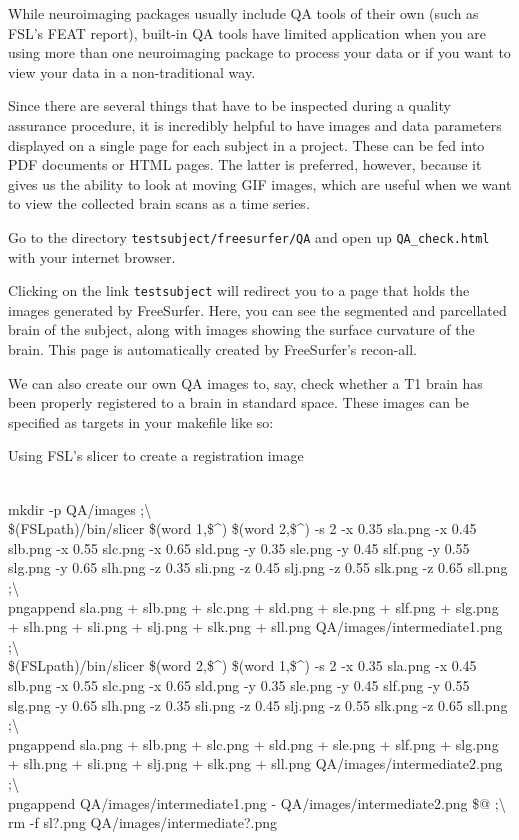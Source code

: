 While neuroimaging packages usually include QA tools of their own (such as FSL's FEAT report), built-in QA tools have limited application when you are using more than one neuroimaging package to process your data or if you want to view your data in a non-traditional way.

Since there are several things that have to be inspected during a quality assurance procedure, it is incredibly helpful to have images and data parameters displayed on a single page for each subject in a project. These can be fed into PDF documents or HTML pages. The latter is preferred, however, because it gives us the ability to look at moving GIF images, which are useful when we want to view the collected brain scans as a time series. 

Go to the directory \texttt{testsubject/freesurfer/QA} and open up \texttt{QA_check.html} with your internet browser. 

Clicking on the link \texttt{testsubject} will redirect you to a page that holds the images generated by FreeSurfer. Here, you can see the segmented and parcellated brain of the subject, along with images showing the surface curvature of the brain. This page is automatically created by FreeSurfer's recon-all.

We can also create our own QA images to, say, check whether a T1 brain has been properly registered to a brain in standard space. These images can be specified as targets in your makefile like so: 
\clearpage
\begin{make}{Using FSL's slicer to create a registration image}{}

 \\
	\tab mkdir -p QA/images ;\textbackslash{} \\
	\tab\$(FSLpath)/bin/slicer \$(word 1,\$\textasciicircum{}) \$(word 2,\$\textasciicircum{}) -s 2 -x 0.35 sla.png -x 0.45 slb.png -x 0.55 slc.png -x 0.65 sld.png -y 0.35 sle.png -y 0.45 slf.png -y 0.55 slg.png -y 0.65 slh.png -z 0.35 sli.png -z 0.45 slj.png -z 0.55 slk.png -z 0.65 sll.png ;\textbackslash{} \\
	\tab pngappend sla.png + slb.png + slc.png + sld.png + sle.png + slf.png + slg.png + slh.png + sli.png + slj.png + slk.png + sll.png QA/images/intermediate1.png ;\textbackslash{} \\
	\tab\$(FSLpath)/bin/slicer \$(word 2,\$\textasciicircum{}) \$(word 1,\$\textasciicircum{}) -s 2 -x 0.35 sla.png -x 0.45 slb.png -x 0.55 slc.png -x 0.65 sld.png -y 0.35 sle.png -y 0.45 slf.png -y 0.55 slg.png -y 0.65 slh.png -z 0.35 sli.png -z 0.45 slj.png -z 0.55 slk.png -z 0.65 sll.png ;\textbackslash{} \\
	\tab pngappend sla.png + slb.png + slc.png + sld.png + sle.png + slf.png + slg.png + slh.png + sli.png + slj.png + slk.png + sll.png QA/images/intermediate2.png ;\textbackslash{} \\
	\tab pngappend QA/images/intermediate1.png - QA/images/intermediate2.png \$@ ;\textbackslash{} \\
	\tab rm -f sl?.png QA/images/intermediate?.png
\end{make}

